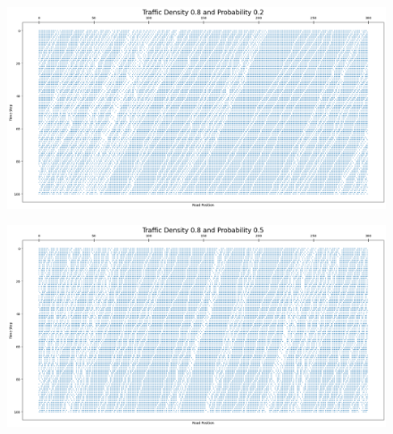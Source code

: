 \documentclass{article}
\begin{document}
\begin{figure}[!h]
    \centering
    \includegraphics[width=0.70\linewidth]{assets/d0.8p0.2.png}
\end{figure}

\begin{figure}[!h]
    \centering
    \includegraphics[width=0.70\linewidth]{assets/d0.8p0.5.png}
\end{figure}
\end{document}
